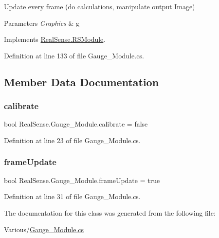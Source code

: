 Update every frame (do calculations, manipulate output Image) 
\begin{DoxyParams}{Parameters}
{\em Graphics} & g \\
\hline
\end{DoxyParams}


Implements \hyperlink{class_real_sense_1_1_r_s_module_a2ec830b7932ee7c0077d473f81c73867}{Real\+Sense.\+R\+S\+Module}.



Definition at line 133 of file Gauge\+\_\+\+Module.\+cs.



\subsection{Member Data Documentation}
\mbox{\label{class_real_sense_1_1_gauge___module_a116882e1610b28a8ce6159b1ddbbf578}} 
\subsubsection{\texorpdfstring{calibrate}{calibrate}}
{\footnotesize\ttfamily bool Real\+Sense.\+Gauge\+\_\+\+Module.\+calibrate = false}



Definition at line 23 of file Gauge\+\_\+\+Module.\+cs.

\mbox{\label{class_real_sense_1_1_gauge___module_ae9d8d183234958600957fdfd23c4d850}} 
\subsubsection{\texorpdfstring{frame\+Update}{frameUpdate}}
{\footnotesize\ttfamily bool Real\+Sense.\+Gauge\+\_\+\+Module.\+frame\+Update = true}



Definition at line 31 of file Gauge\+\_\+\+Module.\+cs.



The documentation for this class was generated from the following file\+:\begin{DoxyCompactItemize}
\item 
Various/\hyperlink{_gauge___module_8cs}{Gauge\+\_\+\+Module.\+cs}\end{DoxyCompactItemize}
